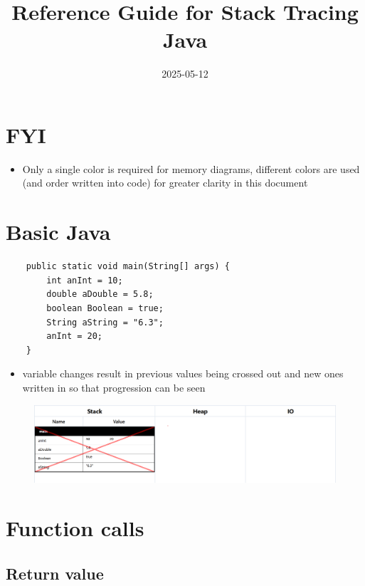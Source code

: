 \documentclass{article}
\begin{document}
\title{Reference Guide for Stack Tracing Java}
\author{}
\date{2025-05-12}

\maketitle

\section*{FYI}
\begin{itemize}
	\item Only a single color is required for memory diagrams, different colors
	are used (and order written into code) for greater clarity in this document
\end{itemize}

\section{Basic Java}

\begin{verbatim}
	public static void main(String[] args) {
	    int anInt = 10;
	    double aDouble = 5.8;
	    boolean Boolean = true;
	    String aString = "6.3";
	    anInt = 20;
	}
\end{verbatim}

\begin{itemize}
	\item variable changes result in previous values being crossed out and
	new ones written in so that progression can be seen
\end{itemize}

\begin{figure}[H]
	\centering
	\includegraphics{basicVariables.png}
\end{figure}

\pagebreak


\section{Function calls}

\subsection{Return value}
\end{document}
